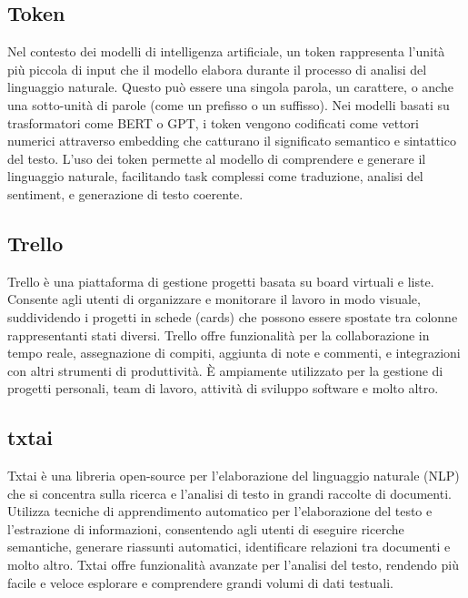 \vspace{2em}
\subsection*{Token}
Nel contesto dei modelli di intelligenza artificiale, un token rappresenta l'unità più piccola di input che il modello elabora durante il processo di analisi del linguaggio naturale. Questo può essere una singola parola, un carattere, o anche una sotto-unità di parole (come un prefisso o un suffisso). Nei modelli basati su trasformatori come BERT o GPT, i token vengono codificati come vettori numerici attraverso embedding che catturano il significato semantico e sintattico del testo. L'uso dei token permette al modello di comprendere e generare il linguaggio naturale, facilitando task complessi come traduzione, analisi del sentiment, e generazione di testo coerente.

\vspace{2em}
\subsection*{Trello}
Trello è una piattaforma di gestione progetti basata su board virtuali e liste. Consente agli utenti di organizzare e monitorare il lavoro in modo visuale, suddividendo i progetti in schede (cards) che possono essere spostate tra colonne rappresentanti stati diversi. Trello offre funzionalità per la collaborazione in tempo reale, assegnazione di compiti, aggiunta di note e commenti, e integrazioni con altri strumenti di produttività. È ampiamente utilizzato per la gestione di progetti personali, team di lavoro, attività di sviluppo software e molto altro.

\vspace{2em}
\subsection*{txtai}
Txtai è una libreria open-source per l'elaborazione del linguaggio naturale (NLP) che si concentra sulla ricerca e l'analisi di testo in grandi raccolte di documenti. Utilizza tecniche di apprendimento automatico per l'elaborazione del testo e l'estrazione di informazioni, consentendo agli utenti di eseguire ricerche semantiche, generare riassunti automatici, identificare relazioni tra documenti e molto altro. Txtai offre funzionalità avanzate per l'analisi del testo, rendendo più facile e veloce esplorare e comprendere grandi volumi di dati testuali.
